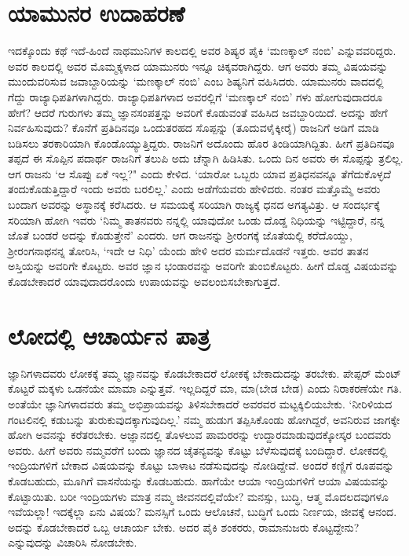 \section*{ಯಾಮುನರ ಉದಾಹರಣೆ}

ಇದಕ್ಕೊಂದು ಕಥೆ ಇದೆ-ಹಿಂದೆ ನಾಥಮುನಿಗಳ ಕಾಲದಲ್ಲಿ ಅವರ ಶಿಷ್ಯರ ಪೈಕಿ `ಮಣಕ್ಕಾಲ್ ನಂಬಿ' ಎನ್ನುವವರಿದ್ದರು. ಅವರ ಕಾಲದಲ್ಲಿ ಅವರ ಮೊಮ್ಮಕ್ಕಳಾದ ಯಾಮುನರು ಇನ್ನೂ ಚಿಕ್ಕವರಾಗಿದ್ದರು. ಆಗ ಅವರು ತಮ್ಮ ವಿಷಯವನ್ನು  ಮುಂದುವರಿಸುವ  ಜವಾಬ್ದಾರಿಯನ್ನು `ಮಣಕ್ಕಾಲ್ ನಂಬಿ' ಎಂಬ ಶಿಷ್ಯನಿಗೆ ವಹಿಸಿದರು. ಯಾಮುನರು ವಾದದಲ್ಲಿ ಗೆದ್ದು ರಾಜ್ಯಾಧಿಪತಿಗಳಾಗಿದ್ದರು. ರಾಜ್ಯಾಧಿಪತಿಗಳಾದ ಅವರಲ್ಲಿಗೆ `ಮಣಕ್ಕಾಲ್ ನಂಬಿ' ಗಳು ಹೋಗುವುದಾದರೂ ಹೇಗೆ? ಆದರೆ ಗುರುಗಳು ತಮ್ಮ ಜ್ಞಾನಸಂಪತ್ತನ್ನು ಅವರಿಗೆ ಕೊಡುವಂತೆ ವಹಿಸಿದ ಜವಬ್ದಾರಿಯಿದೆ. ಅದನ್ನು ಹೇಗೆ ನಿರ್ವಹಿಸುವುದು? ಕೊನೆಗೆ ಪ್ರತಿದಿನವೂ ಒಂದುತರಹದ ಸೊಪ್ಪನ್ನು  (ತೂದುವಳೈಕ್ಕೀರೈ) ರಾಜನಿಗೆ ಅಡಿಗೆ ಮಾಡಿ ಬಡಿಸಲು ತರಕಾರಿಯಾಗಿ ಕೊಂಡೊಯ್ಯುತ್ತಿದ್ದರು. ರಾಜನಿಗೆ ಅದೊಂದು ಹೊರ ತಿಂಡಿಯಾಗಿದ್ದಿತು. ಹೀಗೆ ಪ್ರತಿದಿನವೂ ತಪ್ಪದೆ ಈ ಸೊಪ್ಪಿನ ಪದಾರ್ಥ ರಾಜನಿಗೆ ತಲುಪಿ ಅದು ಚೆನ್ನಾಗಿ ಹಿಡಿಸಿತು. ಒಂದು ದಿನ ಅವರು ಈ ಸೊಪ್ಪನ್ನು ತ್ರಲಿಲ್ಲ. ಆಗ ರಾಜನು `ಆ ಸೊಪ್ಪು  ಏಕೆ ಇಲ್ಲ?" ಎಂದು ಕೇಳಿದ. `ಯಾರೋ ಒಬ್ಬರು ಯಾವ ಪ್ರತಿಧನವನ್ನೂ ತೆಗೆದುಕೊಳ್ಳದೆ ತಂದುಕೊಡುತ್ತಿದ್ದಾರೆ ಇಂದು ಅವರು ಬರಲಿಲ್ಲ.' ಎಂದು ಅಡೆಗೆಯವರು ಹೇಳಿದರು. ನಂತರ ಮತ್ತೊಮ್ಮೆ ಅವರು ಬಂದಾಗ ಅವರನ್ನು ಅಸ್ಥಾನಕ್ಕೆ ಕರೆಸಿದರು. ಆ ಸಮಯಕ್ಕೆ ಸರಿಯಾಗಿ ರಾಜ್ಯಕ್ಕೆ ಧನದ ಅಗತ್ಯವಿತ್ತು. ಆ ಸಂದರ್ಭಕ್ಕೆ ಸರಿಯಾಗಿ ಹೋಗಿ ಇವರು `ನಿಮ್ಮ ತಾತನವರು ನನ್ನಲ್ಲಿ ಯಾವುದೋ ಒಂಡು ದೊಡ್ಡ ನಿಧಿಯನ್ನು ಇಟ್ಟಿದ್ದಾರೆ, ನನ್ನ ಜೊತೆ ಬಂಡರೆ ಅದನ್ನು ಕೊಡುತ್ತೇನೆ' ಎಂದರು. ಆಗ ರಾಜನನ್ನು ಶ್ರೀರಂಗಕ್ಕೆ  ಜೊತೆಯಲ್ಲಿ ಕರೆದೊಯ್ದು, ಶ್ರೀರಂಗನಾಥನನ್ನ ತೋರಿಸಿ, `ಇದೇ ಆ ನಿಧಿ' ಯೆಂದು ಹೇಳಿ ಅದರ ಮರ್ಮದೊಡನೆ ಇತ್ತರು. ಅವರ ತಾತನ ಅಸ್ತಿಯನ್ನು ಅವರಿಗೇ ಕೊಟ್ಟರು. ಅವರ ಜ್ಞಾನ ಭಂಡಾರವನ್ನು ಅವರಿಗೇ ತುಂಬಿಕೊಟ್ಟರು. ಹೀಗೆ ದೊಡ್ಡ ವಿಷಯವನ್ನು ಕೊಡಬೇಕಾದರೆ ಯಾವುದಾದರೊಂದು ಉಪಾಯವನ್ನು ಅವಲಂಬಿಸಬೇಕಾಗುತ್ತದೆ.

\section*{ಲೋದಲ್ಲಿ ಆಚಾರ್ಯನ ಪಾತ್ರ}

ಜ್ಞಾನಿಗಳಾದವರು ಲೋಕಕ್ಕೆ ತಮ್ಮ ಜ್ಞಾನವನ್ನು ಕೊಡಬೇಕಾದರೆ ಲೋಕಕ್ಕೆ ಬೇಕಾದುದನ್ನು ತರಬೇಕು. ಪೇಪ್ಪರ್ ಮೆಂಟ್ ಕೊಟ್ಟರೆ ಮಕ್ಕಳು ಒಡನೆಯೇ ಮಾಮಾ ಎನ್ನುತ್ತವೆ. ಇಲ್ಲದಿದ್ದರೆ ಮಾ, ಮಾ(ಬೇಡ ಬೇಡ) ಎಂದು ನಿರಾಕರಣೆಯೇ ಗತಿ. ಅಂತೆಯೇ ಜ್ಞಾನಿಗಳಾದವರು ತಮ್ಮ ಅಭಿಪ್ರಾಯವನ್ನು ತಿಳಿಸಬೇಕಾದರೆ ಅವರವರ ಮಟ್ಟಕ್ಕಿಲಿಯಬೇಕು. `ನೀರಿಳಿಯದ ಗಂಟಲಿನಲ್ಲಿ ಕಡುಬನ್ನು ತುರುಕುವುದಕ್ಕಾಗುವುದಿಲ್ಲ.' ನಮ್ಮ ಹುಡುಗ ತಪ್ಪಿಸಿಕೊಂಡು ಹೋಗಿದ್ದರೆ, ಅವನಿರುವ ಜಾಗಕ್ಕೇ ಹೋಗಿ ಅವನನ್ನು ಕರೆತರಬೇಕು. ಅಜ್ಞಾನದಲ್ಲಿ ತೊಳಲುವ ಪಾಮರರನ್ನು ಉದ್ದಾರಮಾಡುವುದಕ್ಕೋಸ್ಕರ ಬಂದವರು ಅವರು. ಹೀಗೆ ಅವರು ನಮ್ಮವರೆಗೆ ಬಂದು ಜ್ಞಾನದ ಚೈತನ್ಯವನ್ನು ಕೊಟ್ಟು ಬೆಳೆಸುವುದಕ್ಕೆ ಬಂದಿದ್ದಾರೆ. ಲೋಕದಲ್ಲಿ ಇಂದ್ರಿಯಗಳಿಗೆ ಬೇಕಾದ ವಿಷಯವನ್ನು ಕೊಟ್ಟು ಬಾಳಾಟ ನಡೆಸುವುದನ್ನು ನೋಡಿದ್ದೇವೆ. ಅಂದರೆ ಕಣ್ಣಿಗೆ ರೂಪವನ್ನು ಕೊಡಬಹುದು, ಮೂಗಿಗೆ ವಾಸನೆಯನ್ನು ಕೊಡಬಹುದು. ಹಾಗೆಯೇ ಆಯಾ ಇಂದ್ರಿಯಗಳಿಗೆ ಆಯಾ ವಿಷಯವನ್ನು  ಕೊಟ್ಟಾಯಿತು. ಬರೀ ಇಂದ್ರಿಯಗಳು ಮಾತ್ರ ನಮ್ಮ ಜೀವನದಲ್ಲಿವೆಯೇ? ಮನಸ್ಸು, ಬುದ್ಧಿ, ಆತ್ಮ ಮೊದಲದವುಗಳೂ ಇವೆಯಲ್ಲಾ! ಇದಕ್ಕೆಲ್ಲಾ ಏನು ವಿಷಯ? ಮನಸ್ಸಿಗೆ ಒಂದು ಆಲೊಚನೆ, ಬುದ್ಧಿಗೆ ಒಂದು ನಿರ್ಣಯ, ಜೀವಕ್ಕೆ ಆನಂದ. ಅದನ್ನು ಕೊಡಬೇಕಾದರೆ ಒಬ್ಬ ಆಚಾರ್ಯ ಬೇಕು. ಅದರ ಪೈಕಿ ಶಂಕರರು, ರಾಮಾನುಜರು ಕೊಟ್ಟದ್ದೇನು? ಎನ್ನುವುದನ್ನು ವಿಚಾರಿಸಿ ನೋಡಬೇಕು. 

